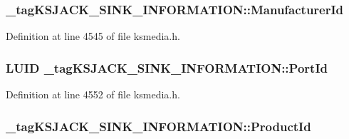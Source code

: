 \subsubsection[{\texorpdfstring{Manufacturer\+Id}{ManufacturerId}}]{ \+\_\+tag\+K\+S\+J\+A\+C\+K\+\_\+\+S\+I\+N\+K\+\_\+\+I\+N\+F\+O\+R\+M\+A\+T\+I\+O\+N\+::\+Manufacturer\+Id}\hypertarget{struct__tag_k_s_j_a_c_k___s_i_n_k___i_n_f_o_r_m_a_t_i_o_n_a5ddb4fe684d3bf9f816ea863707e4b16}{}\label{struct__tag_k_s_j_a_c_k___s_i_n_k___i_n_f_o_r_m_a_t_i_o_n_a5ddb4fe684d3bf9f816ea863707e4b16}


Definition at line 4545 of file ksmedia.\+h.

\subsubsection[{\texorpdfstring{Port\+Id}{PortId}}]{\setlength{\rightskip}{0pt plus 5cm}L\+U\+ID \+\_\+tag\+K\+S\+J\+A\+C\+K\+\_\+\+S\+I\+N\+K\+\_\+\+I\+N\+F\+O\+R\+M\+A\+T\+I\+O\+N\+::\+Port\+Id}\hypertarget{struct__tag_k_s_j_a_c_k___s_i_n_k___i_n_f_o_r_m_a_t_i_o_n_af1ceb41acac11ecc2578f857590e7156}{}\label{struct__tag_k_s_j_a_c_k___s_i_n_k___i_n_f_o_r_m_a_t_i_o_n_af1ceb41acac11ecc2578f857590e7156}


Definition at line 4552 of file ksmedia.\+h.

\subsubsection[{\texorpdfstring{Product\+Id}{ProductId}}]{ \+\_\+tag\+K\+S\+J\+A\+C\+K\+\_\+\+S\+I\+N\+K\+\_\+\+I\+N\+F\+O\+R\+M\+A\+T\+I\+O\+N\+::\+Product\+Id}\hypertarget{struct__tag_k_s_j_a_c_k___s_i_n_k___i_n_f_o_r_m_a_t_i_o_n_a2989c04dc0b03132263e68b73926142c}{}\label{struct__tag_k_s_j_a_c_k___s_i_n_k___i_n_f_o_r_m_a_t_i_o_n_a2989c04dc0b03132263e68b73926142c}


